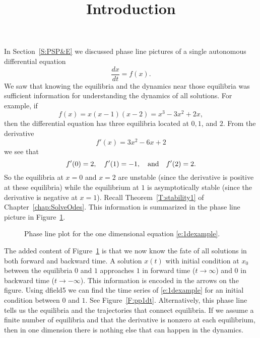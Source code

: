 \documentclass{ximera}
\title{Introduction}
\begin{document}
\begin{abstract}
\end{abstract}
\maketitle


\label{S:introAPNS}

In Section~\ref{S:PSP&E} we discussed phase line pictures of 
a single autonomous 
differential equation 
\[
\frac{dx}{dt} = f(x).
\]
We saw that knowing the equilibria and the dynamics 
near those equilibria was sufficient information for understanding 
the dynamics of all solutions.  For example, if 
\begin{equation}  \label{e:1dexample}
f(x) = x(x-1)(x-2)=x^3-3x^2+2x,
\end{equation}
then the differential equation has three equilibria located at 
$0,1$, and $2$.  From the derivative
\[
f'(x)=3x^2-6x+2
\]
we see that 
\[
f'(0)=2, \quad f'(1)=-1, \quad\mbox{and}\quad f'(2)=2.
\]
So the equilibria at $x=0$ and $x=2$ are unstable 
(since the derivative 
is positive at these equilibria) while the equilibrium at $1$ is 
asymptotically stable (since the derivative is negative at $x=1$). 
Recall Theorem~\ref{T:stability1} of Chapter~\ref{chap:SolveOdes}.  
This information is summarized in the phase line picture in 
Figure~\ref{F:pp1d}.

\begin{figure}[htb]
           \centerline{%
            }
           \caption{Phase line plot for the one dimensional equation
	\protect\eqref{e:1dexample}.}
           \label{F:pp1d}
\end{figure}

The added content of Figure~\ref{F:pp1d} is that we now know the 
fate of all solutions in both forward and backward time.  A 
solution $x(t)$ with initial condition at $x_0$ between the 
equilibria $0$ and $1$ approaches $1$ in forward time
($t\to\infty$) and $0$ in backward time ($t\to -\infty$).  
This information is 
encoded in the arrows on the figure.  Using {\sf dfield5}
 we can 
find the time series of \eqref{e:1dexample} for an initial condition 
between $0$ and $1$.  See Figure~\ref{F:pp1dt}. Alternatively, this  
phase line tells us the equilibria and the trajectories that connect 
equilibria.  If we assume a finite number of equilibria and that the
derivative is nonzero at each equilibrium, then in one dimension 
there is nothing else that can happen in the dynamics.
\end{document}
